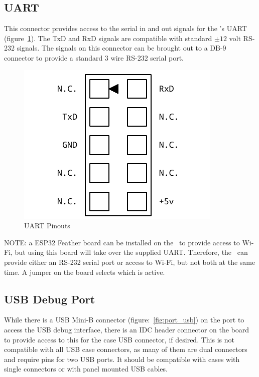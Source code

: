 \subsection*{UART}

This connector provides access to the serial in and out signals for the \jr's UART (figure~\ref{fig:port_uart}). The TxD and RxD signals are compatible with standard $\pm 12$ volt RS-232 signals. The signals on this connector can be brought out to a DB-9 connector to provide a standard 3 wire RS-232 serial port.

\begin{figure}[ht]
    \begin{center}
        \includegraphics[scale=0.75]{images/f256_port_uart.pdf}
    \end{center}
    \caption{UART Pinouts}
    \label{fig:port_uart}
\end{figure}

NOTE: a ESP32 Feather board can be installed on the \jr\ to provide access to Wi-Fi, but using this board will take over the supplied UART. Therefore, the \jr\ can provide either an RS-232 serial port or access to Wi-Fi, but not both at the same time. A jumper on the board selects which is active.

\subsection*{USB Debug Port}

While there is a USB Mini-B connector (figure:~\ref{fig:port_usb}) on the port to access the USB debug interface, there is an IDC header connector on the board to provide access to this for the case USB connector, if desired. This is not compatible with all USB case connectors, as many of them are dual connectors and require pins for two USB ports. It should be compatible with cases with single connectors or with panel mounted USB cables.

